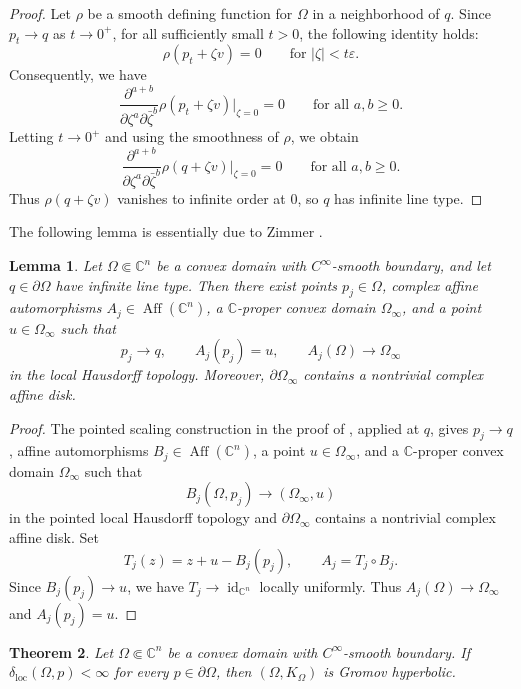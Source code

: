 \documentclass[11pt]{article}
\newtheorem{theorem}{Theorem}[section]
\newtheorem{lemma}[theorem]{Lemma}
\theoremstyle{definition}
\newcommand{\C}{\mathbb{C}}
\newcommand{\eps}{\varepsilon}
\newcommand{\Aff}{\operatorname{Aff}}
\newcommand{\Id}{\operatorname{id}}
\begin{document}
\begin{proof}
	Let \(\rho\) be a smooth defining function for \(\Omega\) in a
	neighborhood of \(q\).  Since \(p_t\to q\) as \(t\to0^+\), for all
	sufficiently small \(t>0\), the following identity holds:
	\[
	\rho(p_t+\zeta v)=0
	\qquad
	\text{for }|\zeta|<t\eps.
	\]
	Consequently, we have
	\[
	\frac{\partial^{a+b}}
	{\partial\zeta^a\partial\bar\zeta^b}
	\rho(p_t+\zeta v)\bigg|_{\zeta=0}
	=0
	\qquad
	\text{for all }a,b\ge0.
	\]
	Letting \(t\to0^+\) and using the smoothness of \(\rho\), we obtain
	\[
	\frac{\partial^{a+b}}
	{\partial\zeta^a\partial\bar\zeta^b}
	\rho(q+\zeta v)\bigg|_{\zeta=0}
	=0
	\qquad
	\text{for all }a,b\ge0.
	\]
	Thus \(\rho(q+\zeta v)\) vanishes to infinite order at \(0\), so \(q\)
	has infinite line type.
\end{proof}

The following lemma is essentially due to Zimmer \cite{ZimmerFiniteType,ZimmerLimitSet}.
\begin{lemma}\label{lem:pointed-scaling}
Let $\Omega\Subset\C^n$ be a convex domain with $C^\infty$-smooth
boundary, and let $q\in\partial\Omega$ have infinite line type. Then
there exist points $p_j\in\Omega$, complex affine automorphisms
$A_j\in\Aff(\C^n)$, a $\C$-proper convex domain $\Omega_\infty$, and a
point $u\in\Omega_\infty$ such that
\[
  p_j\longrightarrow q,\qquad A_j(p_j)=u,
  \qquad A_j(\Omega)\longrightarrow\Omega_\infty
\]
in the local Hausdorff topology. Moreover,
$\partial\Omega_\infty$ contains a nontrivial complex affine disk.
\end{lemma}

\begin{proof}
The pointed scaling construction in the proof of
\cite[Proposition~9.3, especially Lemmas~9.4 and 9.5]{ZimmerLimitSet}, applied
at $q$, gives $p_j\to q$, affine automorphisms
$B_j\in\Aff(\C^n)$, a point $u\in\Omega_\infty$, and a $\C$-proper
convex domain $\Omega_\infty$ such that
\[
  B_j(\Omega,p_j)\longrightarrow(\Omega_\infty,u)
\]
in the pointed local Hausdorff topology and
$\partial\Omega_\infty$ contains a nontrivial complex affine disk.
Set
\[
  T_j(z)=z+u-B_j(p_j),\qquad A_j=T_j\circ B_j.
\]
Since $B_j(p_j)\to u$, we have $T_j\to\Id_{\C^n}$ locally uniformly.
Thus $A_j(\Omega)\to\Omega_\infty$ and $A_j(p_j)=u$.
\end{proof}

\begin{theorem}\label{thm:local-to-global}
Let $\Omega\Subset\C^n$ be a convex domain with $C^\infty$-smooth
boundary. If $\delta_{\mathrm{loc}}(\Omega,p)<\infty$ for every
$p\in\partial\Omega$, then $(\Omega,K_\Omega)$ is Gromov hyperbolic.
\end{theorem}
\end{document}
